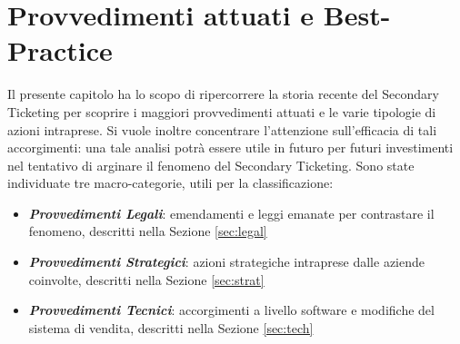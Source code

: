 \chapter{Provvedimenti attuati e Best-Practice}
\label{chap:best_p}

Il presente capitolo ha lo scopo di ripercorrere la storia recente del Secondary Ticketing per scoprire i maggiori provvedimenti attuati e le varie tipologie di azioni intraprese. 
Si vuole inoltre concentrare l'attenzione sull'efficacia di tali accorgimenti: una tale analisi potrà essere utile in futuro per futuri investimenti nel tentativo di arginare il fenomeno del Secondary Ticketing. 
Sono state individuate tre macro-categorie, utili per la classificazione: 
\begin{itemize}
\item \textit{\textbf{Provvedimenti Legali}}: emendamenti e leggi emanate per contrastare il fenomeno, descritti nella Sezione \ref{sec:legal}
\item \textit{\textbf{Provvedimenti Strategici}}: azioni strategiche intraprese dalle aziende coinvolte, descritti nella Sezione \ref{sec:strat}
\item \textit{\textbf{Provvedimenti Tecnici}}: accorgimenti a livello software e modifiche del sistema di vendita, descritti nella Sezione \ref{sec:tech}
\end{itemize}

